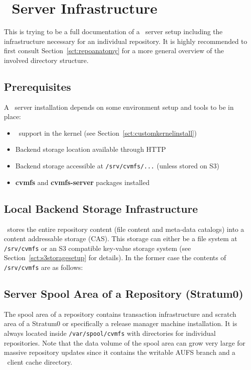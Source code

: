 \chapter{\cvmfs\ Server Infrastructure}
\label{apx:serverinfrastructure}

This is trying to be a full documentation of a \cvmfs\ server setup including the infrastructure necessary for an individual repository.
It is highly recommended to first consult Section~\ref{sct:repoanatomy} for a more general overview of the involved directory structure.

\section{Prerequisites}
A \cvmfs\ server installation depends on some environment setup and tools to be in place:
\begin{itemize}
\item \aufs\ support in the kernel (see Section~\ref{sct:customkernelinstall})
\item Backend storage location available through HTTP
\item Backend storage accessible at \texttt{/srv/cvmfs/...} (unless stored on S3)
\item \textbf{cvmfs} and \textbf{cvmfs-server} packages installed
\end{itemize}
\pagebreak

\section{Local Backend Storage Infrastructure}
\cvmfs\ stores the entire repository content (file content and meta-data catalogs) into a content addressable storage (CAS).
This storage can either be a file system at \texttt{/srv/cvmfs} or an S3 compatible key-value storage system (see Section~\ref{sct:s3storagesetup} for details).
In the former case the contents of \texttt{/srv/cvmfs} are as follows:

\pagebreak

\section{Server Spool Area of a Repository (Stratum0)}
The spool area of a repository contains transaction infrastructure and scratch area of a Stratum0 or specifically a release manager machine installation.
It is always located inside \texttt{/var/spool/cvmfs} with directories for individual repositories.
Note that the data volume of the spool area can grow very large for massive repository updates since it contains the writable AUFS branch and a \cvmfs\ client cache directory.

